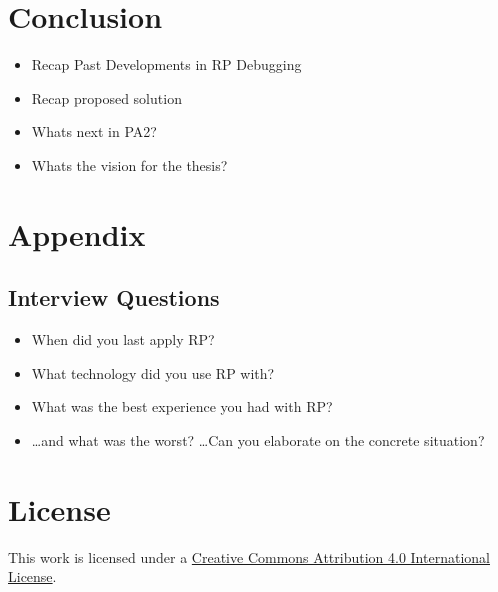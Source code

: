 \documentclass[12pt,a4paper]{article}
\begin{document}
\section{Conclusion}
\label{sec:conclusion}

\begin{itemize}
	\item Recap Past Developments in RP Debugging
	\item Recap proposed solution
	\item Whats next in PA2?
	\item Whats the vision for the thesis?
\end{itemize}


\section{Appendix}

\subsection{Interview Questions}
\label{sec:interviewquestions}

\begin{itemize}
	\item When did you last apply RP?
	\item What technology did you use RP with?
	\item What was the best experience you had with RP?
	\item \dots and what was the worst? \dots Can you elaborate on the concrete situation?
\end{itemize}




\section*{License}
\ccby\thinspace\thinspace This work is licensed under a \href{https://creativecommons.org/licenses/by/4.0/}{Creative Commons Attribution 4.0 International License}.
\end{document}
